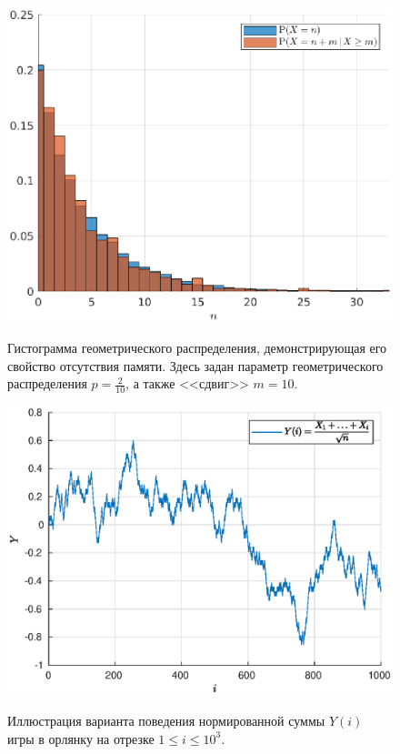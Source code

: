 \begin{figure}[h]
        \noindent
        \centering
        {
                \includegraphics[width=120mm]{task_01/memory.eps}
        }
        \caption{Гистограмма геометрического распределения, демонстрирующая его свойство отсутствия памяти. Здесь задан параметр геометрического распределения $p = \frac{2}{10}$, а также <<сдвиг>> $m = 10$.}
\end{figure}
\begin{figure}[h]
        \noindent
        \centering
        {
                \includegraphics[width=120mm]{task_01/orl.eps}
        }
        \caption{Иллюстрация варианта поведения нормированной суммы $Y(i)$ игры в орлянку на отрезке $1 \leqslant i\leqslant 10^3$.}
\end{figure}